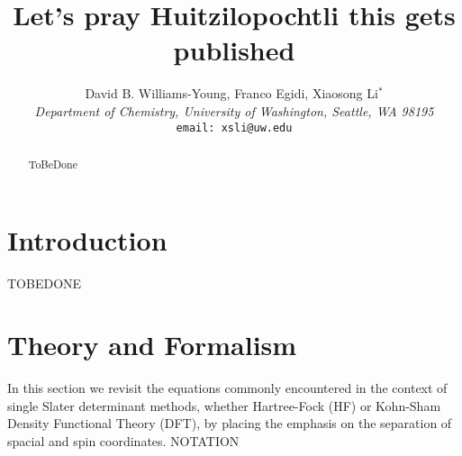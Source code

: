 \documentclass[12pt]{article}
\begin{document}
\title{Let's pray Huitzilopochtli this gets published}
\author{David B. Williams-Young, Franco Egidi, Xiaosong Li$^*$ \\[12pt]
\emph{Department of Chemistry, University of Washington, Seattle, WA 98195} \\[12pt]
\texttt{email: xsli@uw.edu}}
\maketitle

\begin{abstract}
ToBeDone
\end{abstract}

\pagebreak

\section{Introduction}
TOBEDONE

\section{Theory and Formalism}
In this section we revisit the equations commonly encountered in the context of single Slater determinant methods, whether Hartree-Fock (HF) or Kohn-Sham Density Functional Theory (DFT), by placing the emphasis on the separation of spacial and spin coordinates.
NOTATION

\end{document}
